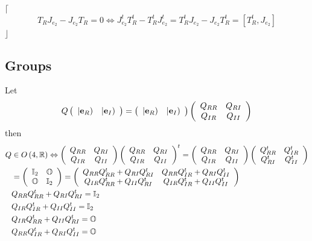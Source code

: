 \documentclass[aps,preprint]{revtex4}%
\begin{document}
$\lceil$%
\begin{equation}
T_{R}J_{e_{2}}-J_{e_{2}}T_{R}=0\Leftrightarrow J_{e_{2}}^{t}T_{R}^{t}%
-T_{R}^{t}J_{e_{2}}^{t}=T_{R}^{t}J_{e_{2}}-J_{e_{2}}T_{R}^{t}=\left[
T_{R}^{t},J_{e_{2}}\right]
\end{equation}
$\rfloor$

\subsection{Groups}

Let%
\begin{equation}
Q\left(
\begin{array}
[c]{cc}%
\left\vert \mathbf{e}_{R}\right)  & \left\vert \mathbf{e}_{I}\right)
\end{array}
\right)  =\left(
\begin{array}
[c]{cc}%
\left\vert \mathbf{e}_{R}\right)  & \left\vert \mathbf{e}_{I}\right)
\end{array}
\right)  \left(
\begin{array}
[c]{cc}%
Q_{RR} & Q_{RI}\\
Q_{IR} & Q_{II}%
\end{array}
\right)
\end{equation}
then%
\begin{align}
Q  &  \in O\left(  4,\mathbb{R}\right)  \Leftrightarrow\left(
\begin{array}
[c]{cc}%
Q_{RR} & Q_{RI}\\
Q_{IR} & Q_{II}%
\end{array}
\right)  \left(
\begin{array}
[c]{cc}%
Q_{RR} & Q_{RI}\\
Q_{IR} & Q_{II}%
\end{array}
\right)  ^{t}=\left(
\begin{array}
[c]{cc}%
Q_{RR} & Q_{RI}\\
Q_{IR} & Q_{II}%
\end{array}
\right)  \left(
\begin{array}
[c]{cc}%
Q_{RR}^{t} & Q_{IR}^{t}\\
Q_{RI}^{t} & Q_{II}^{t}%
\end{array}
\right) \\
&  =\left(
\begin{array}
[c]{cc}%
\mathbb{I}_{2} & \mathbb{O}\\
\mathbb{O} & \mathbb{I}_{2}%
\end{array}
\right)  =\left(
\begin{array}
[c]{cc}%
Q_{RR}Q_{RR}^{t}+Q_{RI}Q_{RI}^{t} & Q_{RR}Q_{IR}^{t}+Q_{RI}Q_{II}^{t}\\
Q_{IR}Q_{RR}^{t}+Q_{II}Q_{RI}^{t} & Q_{IR}Q_{IR}^{t}+Q_{II}Q_{II}^{t}%
\end{array}
\right) \\
&  Q_{RR}Q_{RR}^{t}+Q_{RI}Q_{RI}^{t}=\mathbb{I}_{2}\\
&  Q_{IR}Q_{IR}^{t}+Q_{II}Q_{II}^{t}=\mathbb{I}_{2}\\
&  Q_{IR}Q_{RR}^{t}+Q_{II}Q_{RI}^{t}=\mathbb{O}\\
&  Q_{RR}Q_{IR}^{t}+Q_{RI}Q_{II}^{t}=\mathbb{O}%
\end{align}
\end{document}
